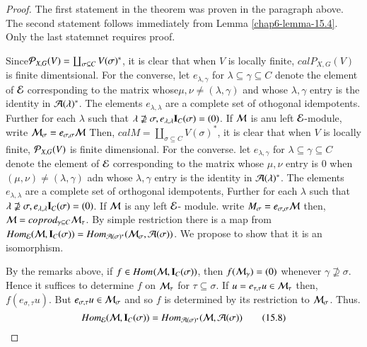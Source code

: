 \begin{proof}
The first statement in the theorem was proven in the paragraph above. The second statement follows immediately from Lemma \ref{chap6-lemma-15.4}. Only the last statemnet requires proof.

Since\pageoriginale $\mathcal{P}_{X, G}(V) = \coprod_{\sigma \subseteq C}V(\sigma)^{*}$, it is clear that when $V$ is locally finite, $calP_{X, G}(V)$ is finite dimentsional. For the converse, let $e_{\lambda, \gamma}$ for $\lambda \subseteq \gamma \subseteq C$ denote the element of $\mathcal{E}$ corresponding to the matrix whose$ \mu, \nu \neq (\lambda, \gamma)$ and whose $\lambda, \gamma$ entry is the identity in $\mathcal{A}(\lambda)^{*}$. The elements $e_{\lambda, \lambda}$ are a complete set of othogonal idempotents. Further for each  $\lambda$ such that $\lambda \nsupseteq \sigma, e_{\lambda, \lambda}\mathbf{I}_{C}(\sigma) = (0)$. If $\mathcal{M}$ is anu left $\mathcal{E}$-module, write $\mathcal{M}_{\sigma} = e_{\sigma, \sigma}\mathcal{M}$ Then, $calM= \coprod_{\sigma \subseteq C}V(\sigma)^{*}$, it is clear that when $V$ is locally finite, $\mathcal{P}_{X, G}(V)$ is finite dimensional. For the converse. let $e_{\lambda, \gamma}$ for $\lambda\subseteq \gamma \subseteq C$ denote the element of $\mathcal{E}$ corresponding to the matrix whose $\mu, \nu$ entry is $0$ when $(\mu, \nu) \neq (\lambda, \gamma)$ adn whose $\lambda,\gamma$ entry is the identity in $\mathcal{A}(\lambda)^{*}$. The elements $e_{\lambda, \lambda}$ are a complete set of orthogonal idempotents, Further for each $\lambda$ such that $\lambda \nsupseteq \sigma, e_{\lambda, \lambda}\mathbf{I}_{C}(\sigma) = (0)$. If $\mathcal{M}$ is any left $\mathcal{E}$- module. write $M_{\sigma}= e_{\sigma, \sigma}\mathcal{M}$ then, $\mathcal{M} = coprod_{\gamma \subseteq C}\mathcal{M}_{\tau}$. By simple restriction there is a map from $Hom_{\mathcal{E}}(\mathcal{M}, \mathbf{I}_{C}(\sigma))= Hom_{\mathcal{A}(\sigma)^{*}}(\mathcal{M}_{\sigma}, \mathcal{A}(\sigma))$. We propose to show that it is an isomorphism.

By the remarks above, if $ f \in Hom_{\cal}(\mathcal{M}, \mathbf{I}_{C}(\sigma))$, then $f(\mathcal{M}_{\gamma}) = (0)$ whenever $\gamma \nsupseteq \sigma$. Hence it suffices to determine $f$ on $\mathcal{M}_{\tau}$ for $\tau \subseteq \sigma$. If $u=e_{\tau, \tau}u \in \mathcal{M}_{\tau}$ then, $f(e_{\sigma, \tau} u)$. But $e_{\sigma, \tau}u \in \mathcal{M}_{\sigma}$ and so $f$ is determined by its restriction to $\mathcal{M}_{\sigma}$. Thus.
\begin{equation*}\label{chap6-eq-15.8}
Hom_{\mathcal{E}}(\mathcal{M}, \mathbf{I}_{C}(\sigma)) = Hom_{\mathcal{A}(\sigma)^{*}}(\mathcal{M}, \mathcal{A}(\sigma))\tag{15.8}
\end{equation*}


\end{proof}
